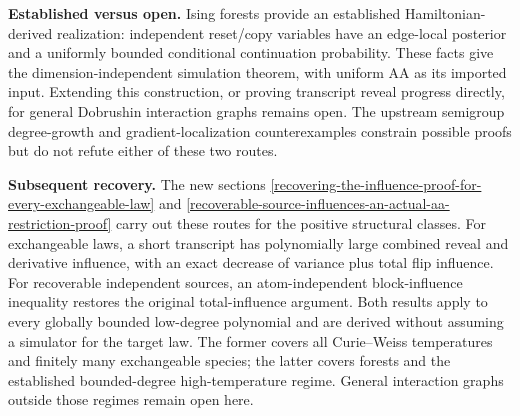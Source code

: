 \textbf{Established versus open.} Ising forests provide an established
Hamiltonian-derived realization: independent reset/copy variables have
an edge-local posterior and a uniformly bounded conditional
continuation probability. These facts give the dimension-independent
simulation theorem, with uniform AA as its imported input. Extending
this construction, or proving transcript reveal progress directly,
for general Dobrushin interaction graphs remains open. The upstream
semigroup degree-growth and gradient-localization counterexamples
constrain possible proofs but do not refute either of these two routes.

\textbf{Subsequent recovery.} The new sections
\ref{recovering-the-influence-proof-for-every-exchangeable-law} and
\ref{recoverable-source-influences-an-actual-aa-restriction-proof}
carry out these routes for the positive structural classes. For exchangeable
laws, a short transcript has polynomially large combined reveal and
derivative influence, with an exact decrease of variance plus total flip
influence. For recoverable independent sources, an atom-independent
block-influence inequality restores the original total-influence argument.
Both results apply to every globally bounded low-degree polynomial and are
derived without assuming a simulator for the target law. The former covers
all Curie--Weiss temperatures and finitely many exchangeable species; the
latter covers forests and the established bounded-degree high-temperature
regime. General interaction graphs outside those regimes remain open here.
